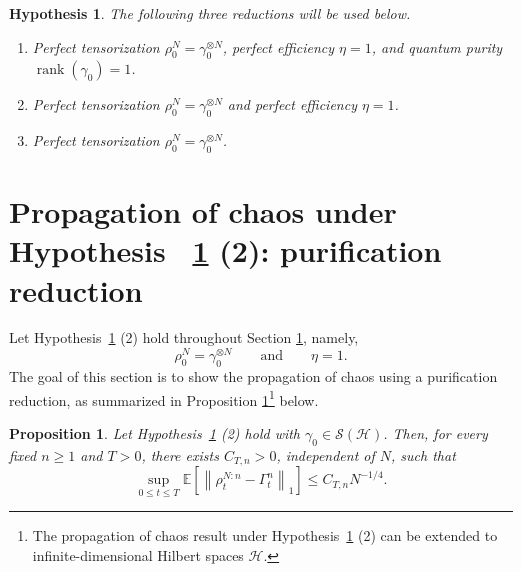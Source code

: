 \documentclass[10pt,a4paper,reqno]{amsart}
\numberwithin{equation}{section}
\theoremstyle{plain}
\newtheorem{proposition}[theorem]{Proposition}
\newtheorem{hypothesis}[theorem]{Hypothesis}
\theoremstyle{definition}
\theoremstyle{remark}
\newcommand{\E}{\mathbb E}
\newcommand{\cS}{\mathcal S}
\newcommand{\HH}{\mathcal H}
\newcommand{\1}{\mathbf 1}
\begin{document}
\begin{hypothesis}\label{hyp:perfect-efficiency-tensorization-purity}
The following three reductions will be used below.
\begin{enumerate}
\item Perfect tensorization \(\rho_0^N=\gamma_0^{\otimes N}\), perfect
efficiency \(\eta=1\), and quantum purity
\(\operatorname{rank}(\gamma_0)=1\).

\item Perfect tensorization \(\rho_0^N=\gamma_0^{\otimes N}\) and perfect
efficiency \(\eta=1\).

\item Perfect tensorization \(\rho_0^N=\gamma_0^{\otimes N}\).
\end{enumerate}
\end{hypothesis}








 




\section[Perfect efficiency and perfect tensorization]{Propagation of chaos under Hypothesis ~\ref{hyp:perfect-efficiency-tensorization-purity} (2): purification reduction}
\label{sec:purification}


Let Hypothesis~\ref{hyp:perfect-efficiency-tensorization-purity} (2) hold throughout Section \ref{sec:purification},  namely,  
\[
\rho_0^N=\gamma_0^{\otimes N} \qquad \mbox{and}\qquad  \eta=1.
\]
The goal of this section is to show the propagation of chaos using a purification reduction,  as summarized in Proposition \ref{prop:main-exact-eta-one}\footnote{The propagation of chaos result under Hypothesis~\ref{hyp:perfect-efficiency-tensorization-purity} (2) can be extended to infinite-dimensional Hilbert spaces $\HH$.} below. 


\begin{proposition}
\label{prop:main-exact-eta-one}
Let Hypothesis~\ref{hyp:perfect-efficiency-tensorization-purity} (2) hold with
$\gamma_0\in\cS(\HH)$.  
Then, for every fixed $n\ge1$ and $T>0$, there exists 
$C_{T,n}>0$, independent of $N$, such that
\begin{equation}
  \sup_{0\le t\le T}
  \E\left[
    \left\|
      \rho_t^{N:n}-\Gamma_t^n
    \right\|_1
  \right]
  \le
  C_{T,n}N^{-1/4}.
  \label{eq:eta-one-mixed-rate}
\end{equation}
\end{proposition}
\end{document}
